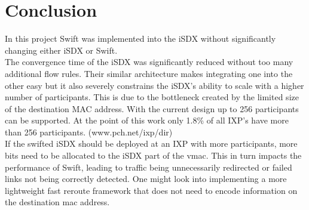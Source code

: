 \chapter{\label{chapter6}Conclusion}
In this project Swift was implemented into the iSDX without significantly changing either iSDX or Swift. \\
The convergence time of the iSDX was significantly reduced without too many additional flow rules. Their similar architecture makes integrating one into the other easy but it also severely constrains the iSDX's ability to scale with a higher number of participants. This is due to the bottleneck created by the limited size of the destination MAC address. With the current design up to 256 participants can be supported. At the point of this work only 1.8\% of all IXP's have more than 256 participants. (www.pch.net/ixp/dir)  \\
If the swifted iSDX should be deployed at an IXP with more participants, more bits need to be allocated to the iSDX part of the vmac. This in turn impacts the performance of Swift, leading to traffic being unnecessarily redirected or failed links not being correctly detected. One might look into implementing a more lightweight fast reroute framework that does not need to encode information on the destination mac address.
